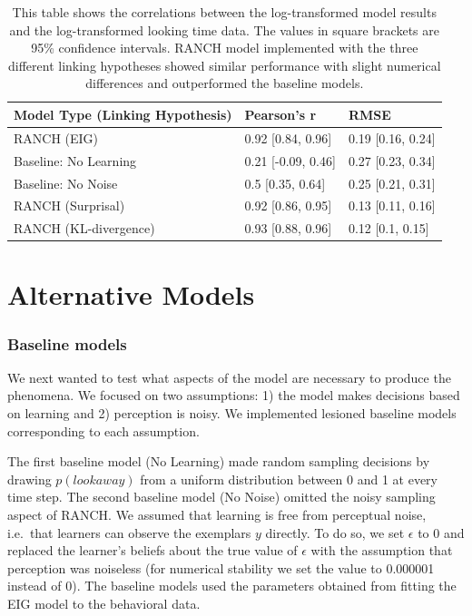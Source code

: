 \documentclass[10pt, letterpaper]{article}
\begin{document}
\begin{table}[ht]
\centering
\begingroup\fontsize{8pt}{9pt}\selectfont
\begin{tabular}{lll}
  \hline
Model Type (Linking Hypothesis) & Pearson's r & RMSE \\ 
  \hline
RANCH (EIG) & 0.92 [0.84, 0.96] & 0.19 [0.16, 0.24] \\ 
  Baseline: No Learning & 0.21 [-0.09, 0.46] & 0.27 [0.23, 0.34] \\ 
  Baseline: No Noise & 0.5 [0.35, 0.64] & 0.25 [0.21, 0.31] \\ 
  RANCH (Surprisal) & 0.92 [0.86, 0.95] & 0.13 [0.11, 0.16] \\ 
  RANCH (KL-divergence) & 0.93 [0.88, 0.96] & 0.12 [0.1, 0.15] \\ 
   \hline
\end{tabular}
\endgroup
\caption{This table shows the correlations between the log-transformed model results and the log-transformed looking time data. The values in square brackets are 95\% confidence intervals. RANCH model implemented with the three different linking hypotheses showed similar performance with slight numerical differences and outperformed the baseline models.} 
\end{table}

\hypertarget{alternative-models}{%
\section{Alternative Models}\label{alternative-models}}

\hypertarget{baseline-models}{%
\subsubsection{Baseline models}\label{baseline-models}}

We next wanted to test what aspects of the model are necessary to
produce the phenomena. We focused on two assumptions: 1) the model makes
decisions based on learning and 2) perception is noisy. We implemented
lesioned baseline models corresponding to each assumption.

The first baseline model (No Learning) made random sampling decisions by
drawing \(p(look away)\) from a uniform distribution between 0 and 1 at
every time step. The second baseline model (No Noise) omitted the noisy
sampling aspect of RANCH. We assumed that learning is free from
perceptual noise, i.e.~that learners can observe the exemplars \(y\)
directly. To do so, we set \(\epsilon\) to 0 and replaced the learner's
beliefs about the true value of \(\epsilon\) with the assumption that
perception was noiseless (for numerical stability we set the value to
0.000001 instead of 0). The baseline models used the parameters obtained
from fitting the EIG model to the behavioral data.
\end{document}
